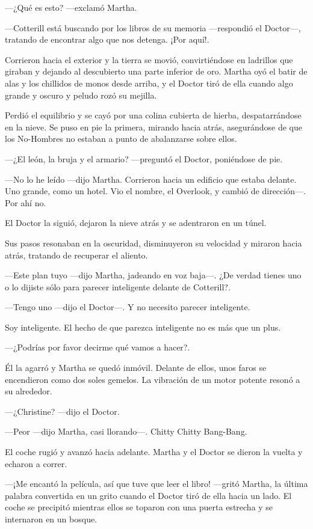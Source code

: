 ---¿Qué es esto? ---exclamó Martha.

---Cotterill está buscando por los libros de su memoria ---respondió el Doctor---, tratando de encontrar algo que nos detenga. ¡Por aquí!.

Corrieron hacia el exterior y la tierra se movió, convirtiéndose en ladrillos que giraban y dejando al descubierto una parte inferior de oro. Martha oyó el batir de alas y los chillidos de monos desde arriba, y el Doctor tiró de ella cuando algo grande y oscuro y peludo rozó su mejilla.

Perdió el equilibrio y se cayó por una colina cubierta de hierba, despatarrándose en la nieve. Se puso en pie la primera, mirando hacia atrás, asegurándose de que los No-Hombres no estaban a punto de abalanzarse sobre ellos.

---¿El león, la bruja y el armario? ---preguntó el Doctor, poniéndose de pie.

---No lo he leído ---dijo Martha. Corrieron hacia un edificio que estaba delante. Uno grande, como un hotel. Vio el nombre, el Overlook, y cambió de dirección---. Por ahí no.

El Doctor la siguió, dejaron la nieve atrás y se adentraron en un túnel.

Sus pasos resonaban en la oscuridad, disminuyeron su velocidad y miraron hacia atrás, tratando de recuperar el aliento.

---Este plan tuyo ---dijo Martha, jadeando en voz baja---. ¿De verdad tienes uno o lo dijiste sólo para parecer inteligente delante de Cotterill?.

---Tengo uno ---dijo el Doctor---. Y no necesito parecer inteligente.

Soy inteligente. El hecho de que parezca inteligente no es más que un plus.

---¿Podrías por favor decirme qué vamos a hacer?.

Él la agarró y Martha se quedó inmóvil. Delante de ellos, unos faros se encendieron como dos soles gemelos. La vibración de un motor potente resonó a su alrededor.

---¿Christine? ---dijo el Doctor.

---Peor ---dijo Martha, casi llorando---. Chitty Chitty Bang-Bang.

El coche rugió y avanzó hacia adelante. Martha y el Doctor se dieron la vuelta y echaron a correr.

---¡Me encantó la película, así que tuve que leer el libro! ---gritó Martha, la última palabra convertida en un grito cuando el Doctor tiró de ella hacia un lado. El coche se precipitó mientras ellos se toparon con una puerta estrecha y se internaron en un bosque.

